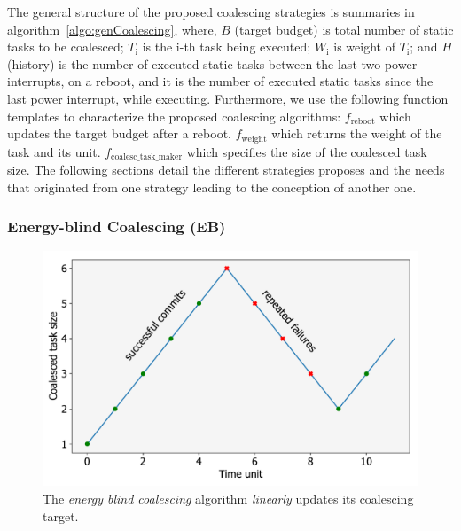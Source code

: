 %
%
The general structure of the proposed coalescing strategies is summaries in algorithm~\ref{algo:genCoalescing}, where, $B$ (target budget) is total number of static tasks to be coalesced; $T_\text{i}$ is the i-th task being executed; $W_\text{i}$ is weight of $T_\text{i}$; and $H$ (history) is the number of executed static tasks between the last two power interrupts, on a reboot, and it is the number of executed static tasks since the last power interrupt, while executing. Furthermore, we use the following function templates to characterize the proposed coalescing algorithms: $f_\text{reboot}$ which updates the target budget after a reboot. $f_\text{weight}$ which returns the weight of the task and its unit. $f_\text{coalesc\_task\_maker}$ which specifies the size of the coalesced task size. The following sections detail the different strategies \sys proposes and the needs that originated from one strategy leading to the conception of another one.

\subsubsection{Energy-blind Coalescing (EB)}
\label{subsec:energyBlind}

\begin{figure}
	\centering
	\includegraphics[width=0.5\columnwidth]{figures/slowCoal}
	\caption{The {\em energy blind coalescing} algorithm \emph{linearly} updates its coalescing target.}
	\label{fig:energyBlind}
\end{figure}

